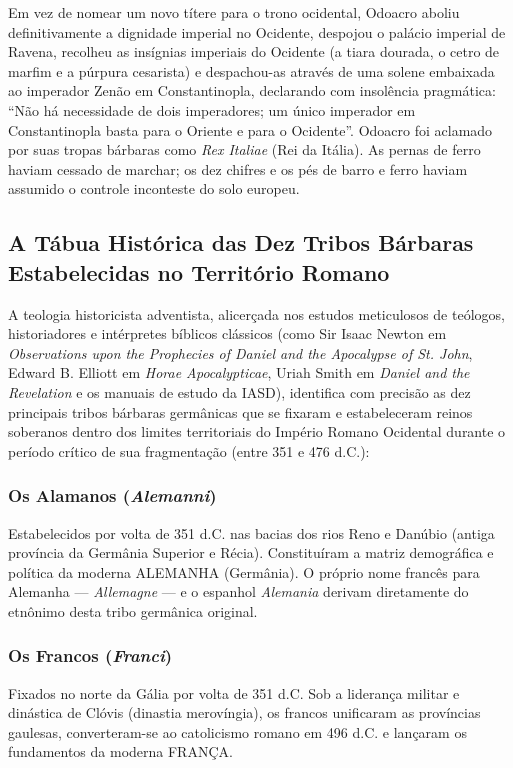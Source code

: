 \documentclass[11pt,a4paper,openany]{book}
\begin{document}
Em vez de nomear um novo títere para o trono ocidental, Odoacro aboliu definitivamente a dignidade imperial no Ocidente, despojou o palácio imperial de Ravena, recolheu as insígnias imperiais do Ocidente (a tiara dourada, o cetro de marfim e a púrpura cesarista) e despachou-as através de uma solene embaixada ao imperador Zenão em Constantinopla, declarando com insolência pragmática: ``Não há necessidade de dois imperadores; um único imperador em Constantinopla basta para o Oriente e para o Ocidente''. Odoacro foi aclamado por suas tropas bárbaras como \textit{Rex Italiae} (Rei da Itália). As pernas de ferro haviam cessado de marchar; os dez chifres e os pés de barro e ferro haviam assumido o controle inconteste do solo europeu.


\subsection{A Tábua Histórica das Dez Tribos Bárbaras Estabelecidas no Território Romano}


A teologia historicista adventista, alicerçada nos estudos meticulosos de teólogos, historiadores e intérpretes bíblicos clássicos (como Sir Isaac Newton em \textit{Observations upon the Prophecies of Daniel and the Apocalypse of St. John}, Edward B. Elliott em \textit{Horae Apocalypticae}, Uriah Smith em \textit{Daniel and the Revelation} e os manuais de estudo da IASD), identifica com precisão as dez principais tribos bárbaras germânicas que se fixaram e estabeleceram reinos soberanos dentro dos limites territoriais do Império Romano Ocidental durante o período crítico de sua fragmentação (entre 351 e 476 d.C.):


\subsubsection*{Os Alamanos (\textit{Alemanni})}
Estabelecidos por volta de 351 d.C. nas bacias dos rios Reno e Danúbio (antiga província da Germânia Superior e Récia). Constituíram a matriz demográfica e política da moderna ALEMANHA (Germânia). O próprio nome francês para Alemanha — \textit{Allemagne} — e o espanhol \textit{Alemania} derivam diretamente do etnônimo desta tribo germânica original.


\subsubsection*{Os Francos (\textit{Franci})}
Fixados no norte da Gália por volta de 351 d.C. Sob a liderança militar e dinástica de Clóvis (dinastia merovíngia), os francos unificaram as províncias gaulesas, converteram-se ao catolicismo romano em 496 d.C. e lançaram os fundamentos da moderna FRANÇA.
\end{document}
